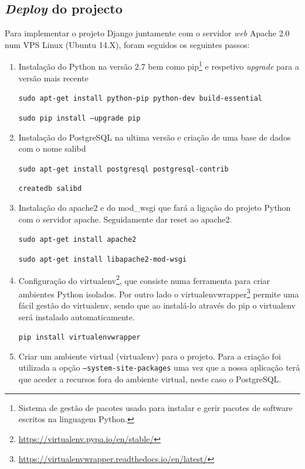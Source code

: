 \subsection{\textit{Deploy} do projecto}

Para implementar o projeto Django juntamente com o servidor \textit{web} Apache 2.0 num \ac{VPS} Linux (Ubuntu 14.X), foram seguidos os seguintes passos: 



\begin{enumerate}
	\item Instalação do Python na versão 2.7 bem como pip\footnote{Sistema de gestão de pacotes usado para instalar e gerir pacotes de software escritos na linguagem Python.} e respetivo \textit{upgrade} para a versão mais recente
	
	\texttt{sudo apt-get install python-pip python-dev build-essential}
	
	\texttt{sudo pip install --upgrade pip}
	
	
	\item Instalação do PostgreSQL na ultima versão e criação de uma base de dados com o nome salibd
	
	
	\texttt{sudo apt-get install postgresql postgresql-contrib}

	\texttt{createdb salibd}	
	
	
	\item Instalação do apache2 e do mod\_wsgi que fará a ligação do projeto Python com o servidor apache. Seguidamente dar reset ao apache2.
	
	\texttt{sudo apt-get install apache2}
	
	\texttt{sudo apt-get install libapache2-mod-wsgi}
	
	
	\item Configuração do virtualenv\footnote{\url{https://virtualenv.pypa.io/en/stable/}}, que consiste numa ferramenta para criar ambientes Python isolados. Por outro lado o virtualenvwrapper\footnote{\url{https://virtualenvwrapper.readthedocs.io/en/latest/}} permite uma fácil gestão do virtualenv, sendo que ao instalá-lo através do pip o virtualenv será instalado automaticamente. 
	
	
	\texttt{pip install virtualenvwrapper}
	
	 
	\item Criar um ambiente virtual (virtualenv) para o projeto. Para a criação foi utilizada a opção \texttt{--system-site-packages} uma vez que a nossa aplicação terá que aceder a recursos fora do ambiente virtual, neste caso o PostgreSQL. 
	

\end{enumerate}
